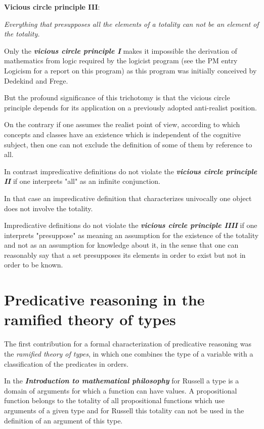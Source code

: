 \documentclass[12pt]{article}
\begin{document}
\quad \textbf{Vicious circle principle III}:
\begin{center}
\emph{Everything that presupposes all the elements of a totality can not be an element of the totality.} 
\end{center}


Only the \textbf{\emph{vicious circle principle I}} makes it impossible the derivation of mathematics from logic required by the logicist program (see the PM entry Logicism for a report on this program) as this program was initially conceived by Dedekind and Frege.

But the profound significance of this trichotomy is that the vicious circle principle depends for its application on a previously adopted anti-realist position.

On the contrary if one assumes the realist point of view, according to which concepts and classes have an existence which is independent of the cognitive subject, then one can not exclude the definition of some of them by reference to all. 

In contrast impredicative definitions do not violate the \textbf{\emph{vicious circle principle II}} if one interprets "all" as an infinite conjunction.

In that case an impredicative definition that characterizes univocally one object does not involve the totality.

Impredicative definitions do not violate the \textbf{\emph{vicious circle principle IIII}} if one interprets "presuppose" as meaning an assumption for the existence of the totality and not as an assumption for knowledge about it, in the sense that one can reasonably say that a set presupposes its elements in order to exist but not in order to be known.

\section{Predicative reasoning in the ramified theory of types}\normalsize

The first contribution for a formal characterization of predicative reasoning was the \emph{ramified theory of types}, in which one combines the type of a variable with a classification of the predicates in orders.

In the \textbf{\emph{Introduction to mathematical philosophy}} for Russell a type is a domain of arguments for which a function can have values. A propositional function belongs to the totality of all propositional functions which use arguments of a given type and for Russell this totality can not be used in the definition of an argument of this type. 
\end{document}
